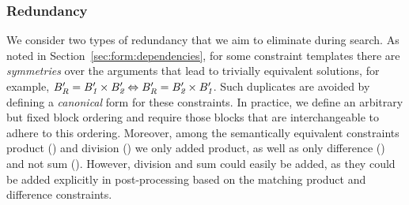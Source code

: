 %





\subsubsection{Redundancy}
We consider two types of redundancy that we aim to eliminate during search.
As noted in Section~\ref{sec:form:dependencies}, for some constraint templates there are \textit{symmetries} over the arguments that lead to trivially equivalent solutions, for example, $B_{\textit{R}}' = B_{\textit{1}}' \times B_{\textit{2}}' \Leftrightarrow B_{\textit{R}}' = B_{\textit{2}}' \times B_{\textit{1}}'$.
Such duplicates are avoided by defining a \textit{canonical} form for these constraints.
In practice, we define an arbitrary but fixed block ordering and require those blocks that are interchangeable to adhere to this ordering.
Moreover, among the semantically equivalent constraints product () and division () we only added product, as well as only difference () and not sum (). However, division and sum could easily be added, as they could be added explicitly in post-processing based on the matching product and difference constraints.


